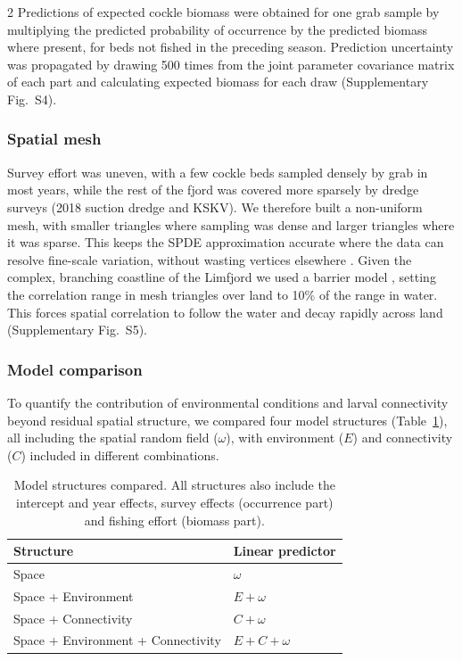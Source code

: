 \begin{spacing}{2}
Predictions of expected cockle biomass were obtained for one grab sample by multiplying the predicted probability of occurrence by the predicted biomass where present, for beds not fished in the preceding season. Prediction uncertainty was propagated by drawing 500 times from the joint parameter covariance matrix of each part and calculating expected biomass for each draw (Supplementary Fig.~S4).

\subsubsection{Spatial mesh}

Survey effort was uneven, with a few cockle beds sampled densely by grab in most years, while the rest of the fjord was covered more sparsely by dredge surveys (2018 suction dredge and KSKV). We therefore built a non-uniform mesh, with smaller triangles where sampling was dense and larger triangles where it was sparse. This keeps the SPDE approximation accurate where the data can resolve fine-scale variation, without wasting vertices elsewhere \citep{lindgren2018}. Given the complex, branching coastline of the Limfjord we used a barrier model \citep{bakkaNonstationaryGaussianModels2019}, setting the correlation range in mesh triangles over land to 10\% of the range in water. This forces spatial correlation to follow the water and decay rapidly across land (Supplementary Fig.~S5).


\subsubsection{Model comparison}

To quantify the contribution of environmental conditions and larval connectivity beyond residual spatial structure, we compared four model structures (Table~\ref{tab:model_structures}), all including the spatial random field ($\omega$), with environment ($E$) and connectivity ($C$) included in different combinations.

\begin{table}[h]
\centering
\caption{Model structures compared. All structures also include the intercept and year effects, survey effects (occurrence part) and fishing effort (biomass part).} 
\label{tab:model_structures}
\begin{tabular}{ll}
\toprule
Structure & Linear predictor \\
\midrule
Space                              & $\omega$ \\
Space   + Environment                & $E + \omega$ \\
Space   + Connectivity               & $C + \omega$ \\
Space  + Environment + Connectivity & $E + C + \omega$ \\
\bottomrule
\end{tabular}
\end{table}


\end{spacing}
